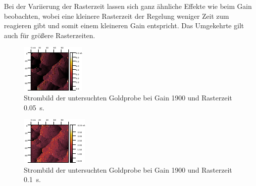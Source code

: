 Bei der Variierung der Rasterzeit lassen sich ganz ähnliche Effekte wie beim Gain beobachten, wobei eine kleinere Rasterzeit der Regelung weniger Zeit zum reagieren gibt und somit einem kleineren Gain entspricht. Das Umgekehrte gilt auch für größere Rasterzeiten.

\begin{figure}[H]
\centering
\includegraphics[width=\textwidth]{../Gwyddion/Gold/TIME_005_I_forward.pdf}
\caption{Strombild der untersuchten Goldprobe bei Gain 1900 und Rasterzeit \SI{0.05}{s}.}
\label{TIME_005_I}
\end{figure}

\begin{figure}[H]
\centering
\includegraphics[width=\textwidth]{../Gwyddion/Gold/TIME_01_I_forward.pdf}
\caption{Strombild der untersuchten Goldprobe bei Gain 1900 und Rasterzeit \SI{0.1}{s}.}
\label{TIME_01_I}
\end{figure}

